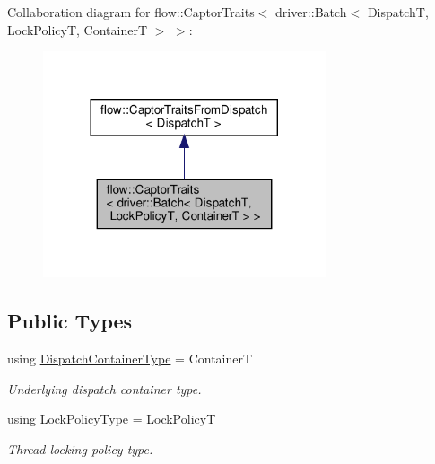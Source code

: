Collaboration diagram for flow\+:\+:Captor\+Traits$<$ driver\+:\+:Batch$<$ DispatchT, Lock\+PolicyT, ContainerT $>$ $>$\+:
\nopagebreak
\begin{figure}[H]
\begin{center}
\leavevmode
\includegraphics[width=236pt]{structflow_1_1_captor_traits_3_01driver_1_1_batch_3_01_dispatch_t_00_01_lock_policy_t_00_01_container_t_01_4_01_4__coll__graph}
\end{center}
\end{figure}
\subsection*{Public Types}
\begin{DoxyCompactItemize}
\item 
\mbox{\label{structflow_1_1_captor_traits_3_01driver_1_1_batch_3_01_dispatch_t_00_01_lock_policy_t_00_01_container_t_01_4_01_4_a64c8347894a5fe9cf684958b3f9ae508}} 
using \hyperlink{structflow_1_1_captor_traits_3_01driver_1_1_batch_3_01_dispatch_t_00_01_lock_policy_t_00_01_container_t_01_4_01_4_a64c8347894a5fe9cf684958b3f9ae508}{Dispatch\+Container\+Type} = ContainerT
\begin{DoxyCompactList}\small\item\em Underlying dispatch container type. \end{DoxyCompactList}\item 
\mbox{\label{structflow_1_1_captor_traits_3_01driver_1_1_batch_3_01_dispatch_t_00_01_lock_policy_t_00_01_container_t_01_4_01_4_acee413b37ecf2d580e007973a6bed6a5}} 
using \hyperlink{structflow_1_1_captor_traits_3_01driver_1_1_batch_3_01_dispatch_t_00_01_lock_policy_t_00_01_container_t_01_4_01_4_acee413b37ecf2d580e007973a6bed6a5}{Lock\+Policy\+Type} = Lock\+PolicyT
\begin{DoxyCompactList}\small\item\em Thread locking policy type. \end{DoxyCompactList}\end{DoxyCompactItemize}


